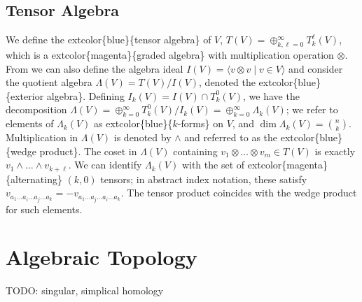 \documentclass[
]{book}
\begin{document}
\hypertarget{tensor-algebra}{%
\section{Tensor Algebra}\label{tensor-algebra}}

We define the extcolor\{blue\}\{tensor algebra\} of \(V\), \(T(V) = \oplus_{k,\ell = 0}^\infty T_k^\ell(V)\), which is a extcolor\{magenta\}\{graded algebra\} with multiplication operation \(\otimes\). From we can also define the algebra ideal \(I(V) = \langle v \otimes v \; | \; v \in V\rangle\) and consider the quotient algebra \(\Lambda(V) = T(V) / I(V)\), denoted the extcolor\{blue\}\{exterior algebra\}. Defining \(I_k(V) = I(V) \cap T_k^0(V)\), we have the decomposition \(\Lambda(V) = \oplus_{k=0}^\infty T_k^0(V)/I_k(V) = \oplus_{k=0}^\infty \Lambda_k(V)\); we refer to elements of \(\Lambda_k(V)\) as extcolor\{blue\}\{\(k\)-forms\} on \(V\), and \(\dim \Lambda_k(V) = \binom{n}{k}\). Multiplication in \(\Lambda(V)\) is denoted by \(\wedge\) and referred to as the extcolor\{blue\}\{wedge product\}. The coset in \(\Lambda(V)\) containing \(v_1 \otimes \dots \otimes v_{m} \in T(V)\) is exactly \(v_1 \wedge \dots \wedge v_{k+\ell}\). We can identify \(\Lambda_k(V)\) with the set of extcolor\{magenta\}\{alternating\} \((k,0)\) tensors; in abstract index notation, these satisfy \(v_{a_1\dots a_i \dots a_j \dots a_k} = -v_{a_1\dots a_j \dots a_i \dots a_k}\). The tensor product coincides with the wedge product for such elements.

\hypertarget{algebraic-topology}{%
\chapter{Algebraic Topology}\label{algebraic-topology}}

TODO: singular, simplical homology

  
\end{document}
